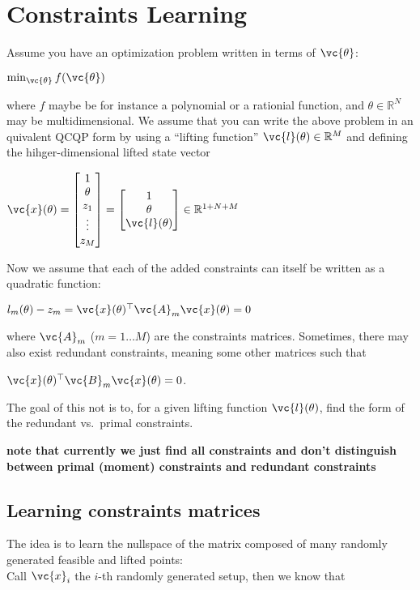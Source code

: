 \section{Constraints Learning}\label{constraints-learning}

Assume you have an optimization problem written in terms of
\(\vc{\theta}\):

\(\min_{\vc{\theta}} f(\vc{\theta})\)

where \(f\) maybe be for instance a polynomial or a rationial function,
and \(\theta \in \mathbb{R}^N\) may be multidimensional. We assume that
you can write the above problem in an quivalent QCQP form by using a
``lifting function'' \(\vc{l}(\theta) \in \mathbb{R}^M\) and
defining the hihger-dimensional lifted state vector

\(\vc{x}(\theta) = \begin{bmatrix}1 \\ \theta \\ z_1 \\ \vdots \\ z_M \end{bmatrix} = \begin{bmatrix}1 \\ \theta \\ \vc{l}(\theta) \end{bmatrix} \in \mathbb{R}^{1+N+M}\)

Now we assume that each of the added constraints can itself be written
as a quadratic function:

\(l_m(\theta) - z_m = \vc{x}(\theta)^\top \vc{A}_m \vc{x}(\theta) = 0\)

where \(\vc{A}_m\) (\(m=1\ldots M\)) are the constraints matrices.
Sometimes, there may also exist redundant constraints, meaning some
other matrices such that

\(\vc{x}(\theta)^\top \vc{B}_m \vc{x}(\theta) = 0\).

The goal of this not is to, for a given lifting function
\(\vc{l}(\theta)\), find the form of the redundant vs.~primal
constraints.

\textbf{note that currently we just find all constraints and don't
distinguish between primal (moment) constraints and redundant
constraints}

\subsection{Learning constraints matrices}

The idea is to learn the nullspace of the matrix composed of many
randomly generated feasible and lifted points:\\
Call \(\vc{x}_{i}\) the \(i\)-th randomly generated setup, then we
know that

